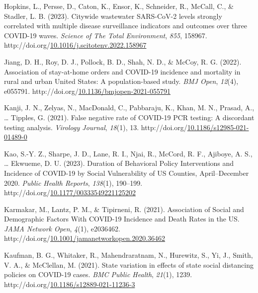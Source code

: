 \documentclass[12pt,twoside]{smiththesis}
\newlength{\cslhangindent}
\newenvironment{CSLReferences}[2] %
 {%
\setlength{\parindent}{0pt}
\ifodd #1 \everypar{\setlength{\hangindent}{\cslhangindent}}\ignorespaces\fi
\ifnum #2 > 0
\setlength{\parskip}{#2\baselineskip}
  \fi
}%
{}
\begin{document}
\begin{CSLReferences}{1}{0}
\leavevmode{}%
Hopkins, L., Persse, D., Caton, K., Ensor, K., Schneider, R., McCall, C., \& Stadler, L. B. (2023). Citywide wastewater {SARS-CoV-2} levels strongly correlated with multiple disease surveillance indicators and outcomes over three {COVID-19} waves. \emph{Science of The Total Environment}, \emph{855}, 158967. http://doi.org/\href{https://doi.org/10.1016/j.scitotenv.2022.158967}{10.1016/j.scitotenv.2022.158967}

\leavevmode{}%
Jiang, D. H., Roy, D. J., Pollock, B. D., Shah, N. D., \& McCoy, R. G. (2022). Association of stay-at-home orders and {COVID-19} incidence and mortality in rural and urban {United States}: A population-based study. \emph{BMJ Open}, \emph{12}(4), e055791. http://doi.org/\href{https://doi.org/10.1136/bmjopen-2021-055791}{10.1136/bmjopen-2021-055791}

\leavevmode{}%
Kanji, J. N., Zelyas, N., MacDonald, C., Pabbaraju, K., Khan, M. N., Prasad, A., \ldots{} Tipples, G. (2021). False negative rate of {COVID-19 PCR} testing: A discordant testing analysis. \emph{Virology Journal}, \emph{18}(1), 13. http://doi.org/\href{https://doi.org/10.1186/s12985-021-01489-0}{10.1186/s12985-021-01489-0}

\leavevmode{}%
Kao, S.-Y. Z., Sharpe, J. D., Lane, R. I., Njai, R., McCord, R. F., Ajiboye, A. S., \ldots{} Ekwueme, D. U. (2023). Duration of {Behavioral Policy Interventions} and {Incidence} of {COVID-19} by {Social Vulnerability} of {US Counties}, {April}--{December} 2020. \emph{Public Health Reports}, \emph{138}(1), 190--199. http://doi.org/\href{https://doi.org/10.1177/00333549221125202}{10.1177/00333549221125202}

\leavevmode{}%
Karmakar, M., Lantz, P. M., \& Tipirneni, R. (2021). Association of {Social} and {Demographic Factors With COVID-19 Incidence} and {Death Rates} in the {US}. \emph{JAMA Network Open}, \emph{4}(1), e2036462. http://doi.org/\href{https://doi.org/10.1001/jamanetworkopen.2020.36462}{10.1001/jamanetworkopen.2020.36462}

\leavevmode{}%
Kaufman, B. G., Whitaker, R., Mahendraratnam, N., Hurewitz, S., Yi, J., Smith, V. A., \& McClellan, M. (2021). State variation in effects of state social distancing policies on {COVID-19} cases. \emph{BMC Public Health}, \emph{21}(1), 1239. http://doi.org/\href{https://doi.org/10.1186/s12889-021-11236-3}{10.1186/s12889-021-11236-3}


\end{CSLReferences}
\end{document}
